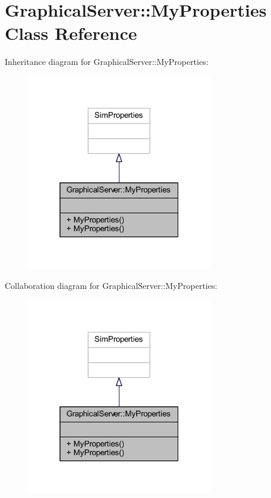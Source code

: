 \hypertarget{class_graphical_server_1_1_my_properties}{}\section{Graphical\+Server\+:\+:My\+Properties Class Reference}
\label{class_graphical_server_1_1_my_properties}


Inheritance diagram for Graphical\+Server\+:\+:My\+Properties\+:
\nopagebreak
\begin{figure}[H]
\begin{center}
\leavevmode
\includegraphics[width=229pt]{class_graphical_server_1_1_my_properties__inherit__graph}
\end{center}
\end{figure}


Collaboration diagram for Graphical\+Server\+:\+:My\+Properties\+:
\nopagebreak
\begin{figure}[H]
\begin{center}
\leavevmode
\includegraphics[width=229pt]{class_graphical_server_1_1_my_properties__coll__graph}
\end{center}
\end{figure}
